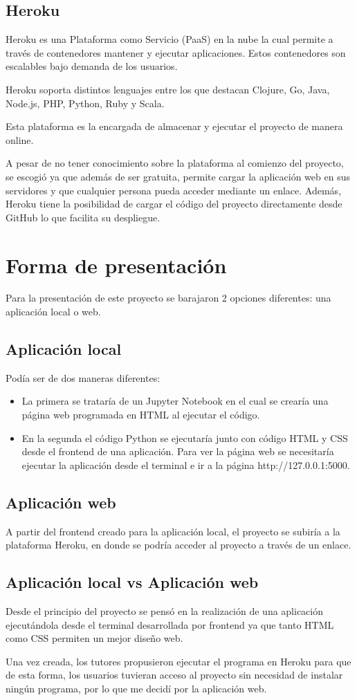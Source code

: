 \subsection{Heroku}
Heroku \cite{wiki:heroku} es una Plataforma como Servicio (PaaS) en la nube la cual permite a través de contenedores mantener y ejecutar aplicaciones. Estos contenedores son escalables bajo demanda de los usuarios.

Heroku soporta distintos lenguajes entre los que destacan Clojure, Go, Java, Node.js, PHP, Python, Ruby y Scala.

Esta plataforma es la encargada de almacenar y ejecutar el proyecto de manera online.

A pesar de no tener conocimiento sobre la plataforma al comienzo del proyecto, se escogió ya que además de ser gratuita, permite cargar la aplicación web en sus servidores y que cualquier persona pueda acceder mediante un enlace. Además, Heroku tiene la posibilidad de cargar el código del proyecto directamente desde GitHub lo que facilita su despliegue.

\section{Forma de presentación}
Para la presentación de este proyecto se barajaron 2 opciones diferentes: una aplicación local o web.
\subsection{Aplicación local}
Podía ser de dos maneras diferentes:
\begin{itemize}
    \item La primera se trataría de un Jupyter Notebook en el cual se crearía una página web programada en HTML al ejecutar el código. 
    \item En la segunda el código Python se ejecutaría junto con código HTML y CSS desde el frontend de una aplicación. Para ver la página web se necesitaría ejecutar la aplicación desde el terminal e ir a la página http://127.0.0.1:5000.
\end{itemize}

\subsection{Aplicación web}
A partir del frontend creado para la aplicación local, el proyecto se subiría a la plataforma Heroku, en donde se podría acceder al proyecto a través de un enlace.

\subsection{Aplicación local vs Aplicación web}
Desde el principio del proyecto se pensó en la realización de una aplicación  ejecutándola desde el terminal desarrollada por frontend ya que tanto HTML como CSS permiten un mejor diseño web.

Una vez creada, los tutores propusieron ejecutar el programa en Heroku para que de esta forma, los usuarios tuvieran acceso al proyecto sin necesidad de instalar ningún programa, por lo que me decidí por la aplicación web.
